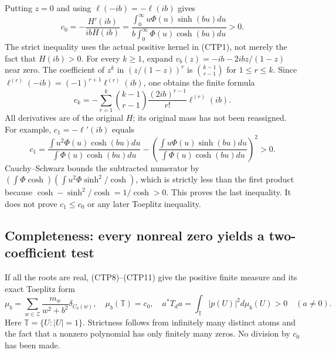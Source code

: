Putting $z=0$ and using $\ell(-ib)=-\ell(ib)$ gives
\begin{equation}\tag{CTP17}
 c_0=-\frac{H'(ib)}{ibH(ib)}
 =\frac{\int_0^\infty u\Phi(u)\sinh(bu)du}
           {b\int_0^\infty\Phi(u)\cosh(bu)du}>0.
\end{equation}
The strict inequality uses the actual positive kernel in (CTP1),
not merely the fact that $H(ib)>0$.
For every $k\ge1$, expand $v_b(z)=-ib-2ibz/(1-z)$ near zero.
The coefficient of $z^k$ in $(z/(1-z))^r$ is
$\binom{k-1}{r-1}$ for $1\le r\le k$. Since
$\ell^{(r)}(-ib)=(-1)^{r+1}\ell^{(r)}(ib)$, one obtains the finite
formula
\begin{equation}\tag{CTP18}
 c_k=-\sum_{r=1}^k
       \binom{k-1}{r-1}\frac{(2ib)^{r-1}}{r!}\ell^{(r)}(ib).
\end{equation}
All derivatives are of the original $H$; its original mass has not
been reassigned. For example, $c_1=-\ell'(ib)$ equals
\begin{equation}\tag{CTP19}
 c_1=\frac{\int u^2\Phi(u)\cosh(bu)du}{\int\Phi(u)\cosh(bu)du}
 -\left(\frac{\int u\Phi(u)\sinh(bu)du}
                  {\int\Phi(u)\cosh(bu)du}\right)^2>0.
\end{equation}
Cauchy--Schwarz bounds the subtracted numerator by
$(\int\Phi\cosh)(\int u^2\Phi\sinh^2/\cosh)$, which is strictly
less than the first product because
$\cosh-\sinh^2/\cosh=1/\cosh>0$. This proves the last inequality.
It does not prove $c_1\le c_0$ or any later Toeplitz inequality.

\subsection{Completeness: every nonreal zero yields a two-coefficient test}

If all the roots are real, (CTP8)--(CTP11) give the positive finite
measure and its exact Toeplitz form
\begin{equation}\tag{CTP20}
 \mu_b=\sum_{w\in\mathcal Z}\frac{m_w}{w^2+b^2}\delta_{C_b(w)},
 \quad \mu_b(\mathbb T)=c_0,\quad
 a^*T_da=\int_{\mathbb T}|p(U)|^2d\mu_b(U)>0\quad(a\ne0).
\end{equation}
Here $\mathbb T=\{U:|U|=1\}$. Strictness follows from infinitely
many distinct atoms and the fact that a nonzero polynomial has only
finitely many zeros. No division by $c_0$ has been made.

